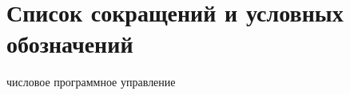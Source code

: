 \chapter*{Список сокращений и условных обозначений} %
\begin{description}[align=right,leftmargin=3.5cm]
\item[ЧПУ] числовое программное управление
\end{description}
